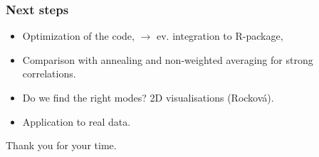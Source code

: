 \documentclass{beamer}
\begin{document}
\begin{frame}
\frametitle{Next steps}
\begin{itemize}
\item Optimization of the code, $\rightarrow$ ev. integration to R-package,
\item Comparison with annealing and non-weighted averaging for strong correlations.
\item Do we find the right modes? 2D visualisations (Rocková).
\item Application to real data.

\end{itemize}
\end{frame}

\begin{frame}
Thank you for your time.
\end{frame}
\end{document}

